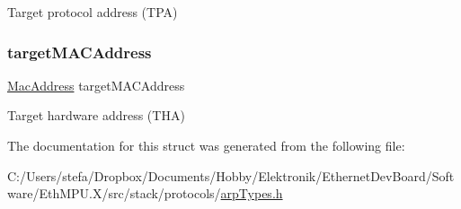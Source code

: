 Target protocol address (T\+PA) 

\mbox{\label{struct_a_r_pmessage__t_a2502d1b812373dc5a0de1647165b40ea}} 
\subsubsection{\texorpdfstring{targetMACAddress}{targetMACAddress}}
{\footnotesize\ttfamily \mbox{\hyperlink{ethernet_types_8h_ae4e06476597d217d540a5e2b2d699649}{Mac\+Address}} target\+M\+A\+C\+Address}



Target hardware address (T\+HA) 



The documentation for this struct was generated from the following file\+:\begin{DoxyCompactItemize}
\item 
C\+:/\+Users/stefa/\+Dropbox/\+Documents/\+Hobby/\+Elektronik/\+Ethernet\+Dev\+Board/\+Software/\+Eth\+M\+P\+U.\+X/src/stack/protocols/\mbox{\hyperlink{arp_types_8h}{arp\+Types.\+h}}\end{DoxyCompactItemize}
